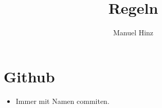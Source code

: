 \documentclass{article}
\author{Manuel Hinz}
\title{Regeln}
\begin{document}
\maketitle

\section{Github}

\begin{itemize}

\item Immer mit Namen commiten.

\end{itemize}
\end{document}
